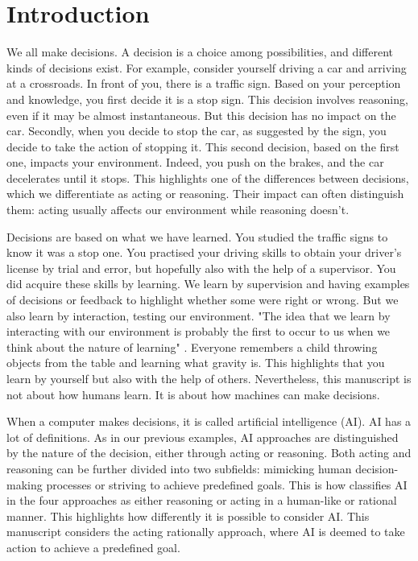 \chapter{Introduction}\label{ch:introduction}

We all make decisions.
A decision is a choice among possibilities, and different kinds of decisions exist.
For example, consider yourself driving a car and arriving at a crossroads.
In front of you, there is a traffic sign.
Based on your perception and knowledge, you first decide it is a stop sign.
This decision involves reasoning, even if it may be almost instantaneous.
But this decision has no impact on the car.
Secondly, when you decide to stop the car, as suggested by the sign, you decide to take the action of stopping it.
This second decision, based on the first one, impacts your environment.
Indeed, you push on the brakes, and the car decelerates until it stops.
This highlights one of the differences between decisions, which we differentiate as acting or reasoning.
Their impact can often distinguish them: acting usually affects our environment while reasoning doesn't.

Decisions are based on what we have learned.
You studied the traffic signs to know it was a stop one.
You practised your driving skills to obtain your driver's license by trial and error, but hopefully also with the help of a supervisor.
You did acquire these skills by learning.
We learn by supervision and having examples of decisions or feedback to highlight whether some were right or wrong.
But we also learn by interaction, testing our environment.
"The idea that we learn by interacting with our environment is probably the first to occur to us when we think about the nature of learning" \citep{sutton2018reinforcement}.
Everyone remembers a child throwing objects from the table and learning what gravity is.
This highlights that you learn by yourself but also with the help of others.
Nevertheless, this manuscript is not about how humans learn. 
It is about how machines can make decisions.

When a computer makes decisions, it is called artificial intelligence (AI).
AI has a lot of definitions.
As in our previous examples, AI approaches are distinguished by the nature of the decision, either through acting or reasoning.
Both acting and reasoning can be further divided into two subfields: mimicking human decision-making processes or striving to achieve predefined goals. 
This is how \cite{russel2010} classifies AI in the four approaches as either reasoning or acting in a human-like or rational manner.
This highlights how differently it is possible to consider AI.
This manuscript considers the acting rationally approach, where AI is deemed to take action to achieve a predefined goal.

